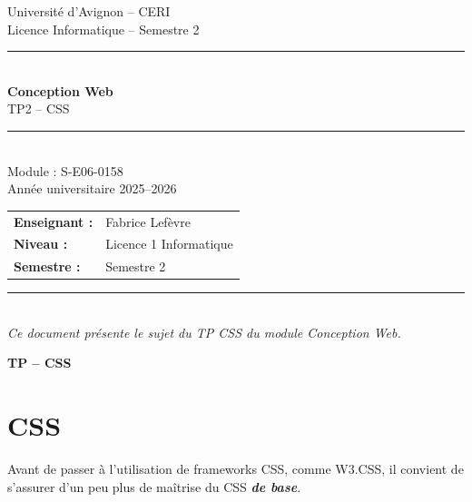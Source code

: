 \documentclass[a4paper,11pt]{article}
\begin{document}
\thispagestyle{empty}
\vspace*{3cm}

\begin{center}
    {\small\textcolor{violetuniv}{Université d'Avignon -- CERI}}\\[0.5cm]
    {\small\textcolor{violetuniv}{Licence Informatique -- Semestre 2}}\\[2cm]

    {\rule{\linewidth}{0.5pt}}\\[0.4cm]
    {\LARGE\bfseries Conception Web}\\[0.3cm]
    {\large TP2 -- CSS}\\[0.4cm]
    {\rule{\linewidth}{0.5pt}}\\[2cm]

    {\large Module : S-E06-0158}\\[0.5cm]
    {\large Année universitaire 2025--2026}\\[3cm]

    \begin{tabular}{ll}
        \textbf{Enseignant :} & Fabrice Lefèvre \\
        \textbf{Niveau :}     & Licence 1 Informatique \\
        \textbf{Semestre :}   & Semestre 2 \\
    \end{tabular}
\end{center}

\vfill

\begin{center}
    \textcolor{borduregrise}{\rule{\linewidth}{0.3pt}}\\[0.3cm]
    {\small\textit{Ce document présente le sujet du TP CSS du module Conception Web.}}
\end{center}

\newpage
{}

{\Large\bfseries TP -- CSS}

\bigskip

\section{CSS}

Avant de passer à l'utilisation de frameworks CSS, comme W3.CSS, il convient de s'assurer d'un peu plus de maîtrise du CSS \textit{\textbf{de base}}.
\end{document}
